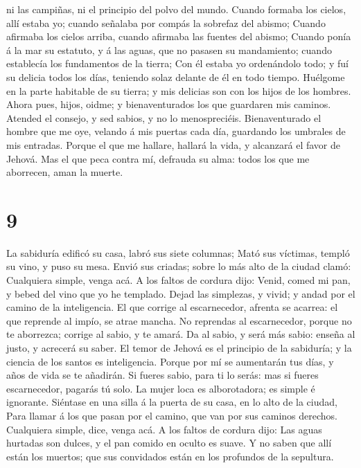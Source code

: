 ni las campiñas, ni el principio del polvo del mundo. 
Cuando formaba los cielos, allí estaba yo; cuando señalaba por compás la
sobrefaz del abismo;  Cuando afirmaba los cielos arriba,
cuando afirmaba las fuentes del abismo;  Cuando ponía á la
mar su estatuto, y á las aguas, que no pasasen su mandamiento; cuando
establecía los fundamentos de la tierra;  Con él estaba yo
ordenándolo todo; y fuí su delicia todos los días, teniendo solaz
delante de él en todo tiempo.  Huélgome en la parte
habitable de su tierra; y mis delicias son con los hijos de los hombres.
 Ahora pues, hijos, oidme; y bienaventurados los que
guardaren mis caminos.  Atended el consejo, y sed sabios, y
no lo menospreciéis.  Bienaventurado el hombre que me oye,
velando á mis puertas cada día, guardando los umbrales de mis entradas.
 Porque el que me hallare, hallará la vida, y alcanzará el
favor de Jehová.  Mas el que peca contra mí, defrauda su
alma: todos los que me aborrecen, aman la muerte.

\hypertarget{section-8}{%
\section{9}\label{section-8}}

 La sabiduría edificó su casa, labró sus siete columnas;
 Mató sus víctimas, templó su vino, y puso su mesa.
 Envió sus criadas; sobre lo más alto de la ciudad clamó:
 Cualquiera simple, venga acá. A los faltos de cordura dijo:
 Venid, comed mi pan, y bebed del vino que yo he templado.
 Dejad las simplezas, y vivid; y andad por el camino de la
inteligencia.  El que corrige al escarnecedor, afrenta se
acarrea: el que reprende al impío, se atrae mancha.  No
reprendas al escarnecedor, porque no te aborrezca; corrige al sabio, y
te amará.  Da al sabio, y será más sabio: enseña al justo, y
acrecerá su saber.  El temor de Jehová es el principio de
la sabiduría; y la ciencia de los santos es inteligencia. 
Porque por mí se aumentarán tus días, y años de vida se te añadirán.
 Si fueres sabio, para ti lo serás: mas si fueres
escarnecedor, pagarás tú solo.  La mujer loca es
alborotadora; es simple é ignorante.  Siéntase en una silla
á la puerta de su casa, en lo alto de la ciudad,  Para
llamar á los que pasan por el camino, que van por sus caminos derechos.
 Cualquiera simple, dice, venga acá. A los faltos de
cordura dijo:  Las aguas hurtadas son dulces, y el pan
comido en oculto es suave.  Y no saben que allí están los
muertos; que sus convidados están en los profundos de la sepultura.

